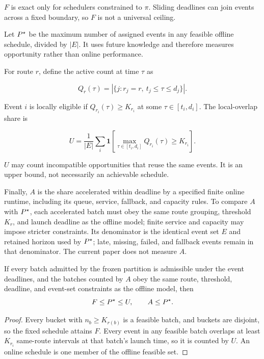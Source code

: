 $F$ is exact only for schedulers constrained to $\pi$. Sliding deadlines can
join events across a fixed boundary, so $F$ is not a universal ceiling.

Let $P^\star$ be the maximum number of assigned events in any feasible offline
schedule, divided by $|E|$. It uses future knowledge and therefore measures
opportunity rather than online performance.

For route $r$, define the active count at time $\tau$ as

\begin{equation}
  Q_r(\tau)=|\{j:r_j=r,\ t_j\leq\tau\leq d_j\}|.
\end{equation}

Event $i$ is locally eligible if $Q_{r_i}(\tau)\geq K_{r_i}$ at some
$\tau\in[t_i,d_i]$. The local-overlap share is

\begin{equation}
  U=\frac{1}{|E|}\sum_i \mathbf{1}\!\left[
  \max_{\tau\in[t_i,d_i]}Q_{r_i}(\tau)\geq K_{r_i}\right].
  \label{eq:upper}
\end{equation}

$U$ may count incompatible opportunities that reuse the same events. It is an
upper bound, not necessarily an achievable schedule.

Finally, $A$ is the share accelerated within deadline by a specified finite
online runtime, including its queue, service, fallback, and capacity rules. To
compare $A$ with $P^\star$, each accelerated batch must obey the same route
grouping, threshold $K_r$, and launch deadline as the offline model; finite
service and capacity may impose stricter constraints. Its denominator is the
identical event set $E$ and retained horizon used by $P^\star$; late, missing,
failed, and fallback events remain in that denominator. The current paper does
not measure $A$.

\begin{proposition}
\label{prop:ordering}
If every batch admitted by the frozen partition is admissible under the event
deadlines, and the batches counted by $A$ obey the same route, threshold,
deadline, and event-set constraints as the offline model, then
\begin{equation}
  F\leq P^\star\leq U,\qquad A\leq P^\star.
  \label{eq:ordering}
\end{equation}
\end{proposition}

\begin{proof}
Every bucket with $n_b\geq K_{r(b)}$ is a feasible batch, and buckets are
disjoint, so the fixed schedule attains $F$. Every event in any feasible batch
overlaps at least $K_{r_i}$ same-route intervals at that batch's launch time,
so it is counted by $U$. An online schedule is one member of the offline
feasible set.
\end{proof}


